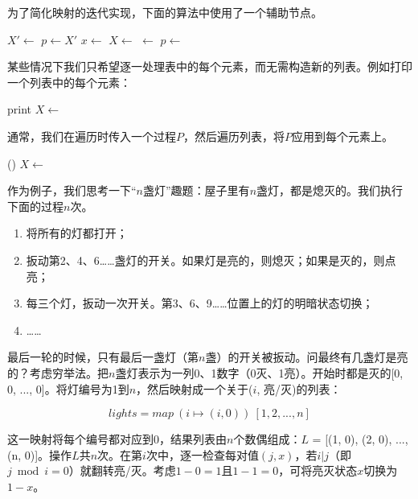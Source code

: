 \documentclass[b5paper]{ctexart}
\begin{document}
为了简化映射的迭代实现，下面的算法中使用了一个辅助节点。

\begin{algorithmic}[1]
  \State $X' \gets$  
  \State $p \gets X'$
    \State $x \gets$ 
    \State $X \gets$ 
    \State {} $\gets$ 
    \State $p \gets$ 
  \EndWhile
  \State \Return {} 
\EndFunction
\end{algorithmic}

某些情况下我们只希望逐一处理表中的每个元素，而无需构造新的列表。例如打印一个列表中的每个元素：

\begin{algorithmic}[1]
    \State print 
    \State $X \gets$ 
  \EndWhile
\EndFunction
\end{algorithmic}

通常，我们在遍历时传入一个过程$P$，然后遍历列表，将$P$应用到每个元素上。

\begin{algorithmic}[1]
    \State {}()
    \State $X \gets$ 
  \EndWhile
\EndFunction
\end{algorithmic}

作为例子，我们思考一下“$n$盏灯”趣题\cite{poj-drunk-jailer}：屋子里有$n$盏灯，都是熄灭的。我们执行下面的过程$n$次。

\begin{enumerate}
\item 将所有的灯都打开；
\item 扳动第2、4、6……盏灯的开关。如果灯是亮的，则熄灭；如果是灭的，则点亮；
\item 每三个灯，扳动一次开关。第3、6、9……位置上的灯的明暗状态切换；
\item ……
\end{enumerate}

最后一轮的时候，只有最后一盏灯（第$n$盏）的开关被扳动。问最终有几盏灯是亮的？考虑穷举法。把$n$盏灯表示为一列0、1数字（0灭、1亮）。开始时都是灭的[0, 0, ..., 0]。将灯编号为1到$n$，然后映射成一个关于($i$, 亮/灭)的列表：

\[
lights = map\ (i \mapsto (i, 0))\ [1, 2, ..., n]
\]

这一映射将每个编号都对应到0，结果列表由$n$个数偶组成：$L$ = [(1, 0), (2, 0), ..., (n, 0)]。操作$L$共$n$次。在第$i$次中，逐一检查每对值$(j, x)$，若$i | j$（即$j \bmod i = 0$）就翻转亮/灭。考虑$1 - 0 = 1$且$1 - 1 = 0$，可将亮灭状态$x$切换为$1 - x$。
\end{document}
